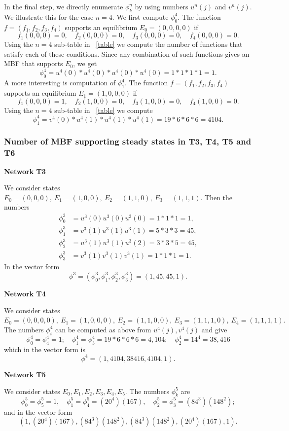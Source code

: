 \documentclass[11pt,a4paper]{article}
\theoremstyle{definition}
\theoremstyle{remark}
\begin{document}
In the final step, we directly enumerate $\phi^n_k$ by using numbers $u^n(j)$ and $v^n(j)$. We illustrate this for the case $n=4$.
We first compute $\phi^4_0$.
The function $f=(f_1, f_2, f_3, f_4)$ supports an equilibrium $E_0=(0,0,0,0)$ if 
\[ f_1(0,0,0)=0, \quad f_2(0,0,0) = 0, \quad f_3(0,0,0) = 0, \quad f_4(0,0,0) = 0.\]
Using the $n=4$ sub-table in ~\cref{table} we compute the number of functions that satisfy each of these conditions. Since any combination of such functions gives an MBF that supports $E_0$, we get 
\[ \phi^4_0 = u^4(0)*u^4(0)*u^4(0)*u^4(0) = 1*1*1*1 =1. \]
A more interesting is computation of
 $\phi^4_1$.
The function $f=(f_1, f_2, f_3, f_4)$ supports an equilibrium $E_1=(1,0,0,0)$ if 
\[ f_1(0,0,0)=1, \quad f_2(1,0,0) = 0, \quad f_3(1,0,0) = 0, \quad f_4(1,0,0) = 0.\]
Using the $n=4$ sub-table in ~\cref{table} we compute 
\[ \phi^4_1 = v^4(0)*u^4(1)*u^4(1)*u^4(1) = 19*6*6*6 =4104. \]


\subsubsection{Number of MBF supporting  steady states in T3, T4, T5 and T6}

{\bf Network T3}

We consider states $E_0=(0,0,0),\ E_1=(1,0,0),\ E_2=(1,1,0),\ E_3=(1,1,1)$.
Then the numbers 
\begin{align*}
\phi^3_0 &= u^3(0)u^3(0)u^3(0) = 1*1*1=1, \\
\phi^3_1 &= v^3(1)u^3(1)u^3(1) = 5*3*3=45,\\
\phi^3_2 &= u^3(1)u^3(1)u^3(2)= 3*3*5 = 45,\\
\phi^3_3& =v^3(1)v^3(1)v^3(1)= 1*1*1=1. 
\end{align*}
 In the vector form
 \[
 \phi^3=(\phi^3_0,\phi^3_1, \phi^3_2, \phi^3_3) =  (1,45,45,1).
\]

{\bf Network T4  }

We consider states  $E_0=(0,0,0,0),\  E_1=(1,0,0,0),\ E_2=(1,1,0,0),\ E_3=(1,1,1,0),\ E_4=(1,1,1,1).$
The numbers $\phi^4_i$ can be computed as above from $u^4(j), v^4(j)$ and give 
\[
\phi^4_0 = \phi^4_4 = 1; \quad \phi^4_1 = \phi^4_3 = 19*6*6*6 = 4,104; \quad  \phi^4_2 =14^4= 38,416 \]
which  in the vector form is
 \[
\phi^4=  (1,4104, 38416, 4104, 1).
\]

{\bf  Network T5  }

We consider states $ E_0, E_1, E_2, E_3, E_4, E_5 $. The numbers $\phi^5_k$ are 
\[
\phi^5_0 = \phi^5_5 = 1 , \quad \phi^5_1 = \phi^5_4 = (20^4)(167), \quad \phi^5_2 = \phi^5_3 = (84^3)(148^2);
\]
and in the vector form
\[ (1, (20^4)(167), (84^3)(148^2),(84^3)(148^2), (20^4)(167),1) .\]
\end{document}
